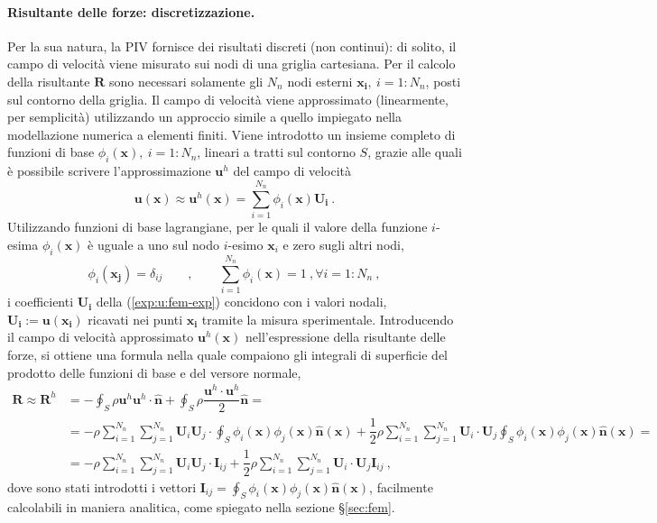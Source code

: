 \paragraph{Risultante delle forze: discretizzazione.}
Per la sua natura, la PIV fornisce dei risultati discreti (non continui): di solito, il campo di velocità viene misurato sui nodi di una griglia cartesiana. Per il calcolo della risultante $\bm{R}$ sono necessari solamente gli $N_n$ nodi esterni $\bm{x_i}, \ i=1:N_n$, posti sul contorno della griglia.
\newline
Il campo di velocità viene approssimato (linearmente, per semplicità) utilizzando un approccio simile a quello impiegato nella modellazione numerica a elementi finiti. Viene introdotto un insieme completo di funzioni di base $\phi_i(\bm{x}), \ i=1:N_{n}$, lineari a tratti sul contorno $S$, grazie alle quali è possibile scrivere l'approssimazione $\bm{u}^h$ del campo di velocità
\begin{equation}\label{exp:u:fem-exp}
 \bm{u}(\bm{x}) \approx \bm{u}^h(\bm{x}) = \displaystyle\sum_{i=1}^{N_n} \phi_i(\bm{x}) \bm{U_i} \ . 
\end{equation}
Utilizzando funzioni di base lagrangiane, per le quali il valore della funzione $i$-esima $\phi_i(\bm{x})$ è uguale a uno sul nodo $i$-esimo $\bm{x}_i$ e zero sugli altri nodi,
\begin{equation}
 \phi_i(\bm{x_j}) = \delta_{ij} \qquad , \qquad \displaystyle\sum_{i=1}^{N_n} \phi_i(\bm{x}) = 1  \ , \forall i=1:N_n \ ,
\end{equation}
i coefficienti $\bm{U_i}$ della (\ref{exp:u:fem-exp}) concidono con i valori nodali, $\bm{U_i}:=\bm{u}(\bm{x_i})$ ricavati nei punti $\bm{x_i}$ tramite la misura sperimentale. Introducendo il campo di velocità approssimato $\bm{u}^h(\bm{x})$ nell'espressione della risultante delle forze, si ottiene una formula nella quale compaiono gli integrali di superficie del prodotto delle funzioni di base e del versore normale, 
\begin{equation}\label{eqn:RU}
\begin{aligned}
 \bm{R} \approx \bm{R}^h & = -\oint_S \rho \bm{u}^h \bm{u}^h \cdot \bm{\hat{n}} + \oint_S \rho \dfrac{\bm{u}^h \cdot \bm{u}^h}{2} \bm{\hat{n}} = \\
 & = - \rho \sum_{i=1}^{N_n} \sum_{j=1}^{N_n} \bm{U}_i \bm{U}_j \cdot \oint_S \phi_i(\bm{x}) \phi_j(\bm{x}) \bm{\hat{n}}(\bm{x})  + \dfrac{1}{2} \rho \sum_{i=1}^{N_n} \sum_{j=1}^{N_n}\bm{U}_i \cdot \bm{U}_j \oint_S  \phi_i(\bm{x}) \phi_j(\bm{x}) \bm{\hat{n}}(\bm{x}) = \\ 
 & = - \rho \sum_{i=1}^{N_n} \sum_{j=1}^{N_n} \bm{U}_i \bm{U}_j \cdot \bm{I}_{ij}  + \dfrac{1}{2} \rho \sum_{i=1}^{N_n} \sum_{j=1}^{N_n}\bm{U}_i \cdot \bm{U}_j \bm{I}_{ij} \ , 
\end{aligned}
\end{equation}
dove sono stati introdotti i vettori $\bm{I}_{ij} = \oint_S  \phi_i(\bm{x}) \phi_j(\bm{x}) \bm{\hat{n}}(\bm{x})$, facilmente calcolabili in maniera analitica, come spiegato nella sezione \S\ref{sec:fem}. \newline

